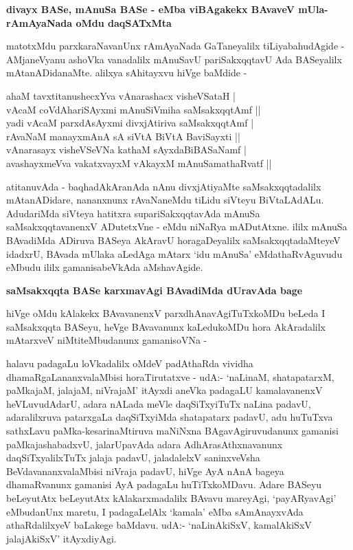 {\bigskip
\noindent
{\large\bf divayx BASe, mAnuSa BASe - eMba viBAgakekx BAvaveV mUla-rAmAyaNada oMdu daqSATxMta}}\label{page14}
\medskip

\noindent
matotxMdu parxkaraNavanUnx rAmAyaNada GaTaneyalilx tiLiyabahudAgide - AMjaneVyanu a\-shoVka vana\-dalilx mAnuSavU pariSakxqqtavU Ada BASeyalilx mAtanADidanaMte. alilxya sAhitayxvu hiVge baMdide - 

\smallskip
\begin{shloka}
ahaM tavxtitanushecxYva vAnarashacx visheVSataH |\\\label{14}
vAcaM coVdAhariSAyxmi mAnuSiVmiha saMsakxqqtAmf ||\\[4pt]

yadi vAcaM parxdAsAyxmi divxjAtiriva saMsakxqqtAmf |\\
rAvaNaM manayxmAnA sA siVtA BiVtA BaviSayxti ||\\[4pt]

vAnarasayx visheVSeVNa kathaM sAyxdaBiBASaNamf |\\
avashayxmeVva vakatxvayxM vAkayxM mAnuSamathaRvatf ||
\end{shloka}
\smallskip

\noindent
atitanuvAda - baqhadAkAranAda nAnu divxjAtiyaMte saMsakxqqtadalilx mAtanADi\-dare, nananxnunx rAvaNa\-neMdu tiLidu siVteyu BiVtaLAdALu. AdudariMda siVteya hatitxra supariSakxqqtavAda mAnuSa saMsakxqqta\-vanenxV ADutetxVne - eMdu niNaRya mADutAtxne. ililx mAnuSa BAvadiMda ADiruva BASeya AkA\-ravU horagaDeyalilx saMsakxqqtadaMteyeV idadxrU, BAvada mUlaka aLedAga mAtarx `idu mAnuSa' eMdathaRvAguvudu eMbudu ililx gamanisabeVkAda aMshavAgide.

\newpage

{\bigskip
\noindent
{\large\bf saMsakxqqta BASe karxmavAgi BAvadiMda dUravAda bage}}\label{page15}
\medskip

\noindent
hiVge oMdu kAlakekx BAvavanenxV parxdhAnavAgiTuTxkoMDu beLeda I saMsakxqqta BASeyu, heVge BAva\-vanunx kaLedukoMDu hora AkAradalilx mAtarxveV niMtiteMbudanunx gamanisoVNa - 

halavu padagaLu loVkadalilx oMdeV padAthaRda vividha dhamaRgaLananxvalaMbisi horaTirutatxve - udA:- `naLinaM, shatapatarxM, paMkajaM, jalajaM, niVrajaM' itAyxdi aneVka padagaLU kamalavanenxV heVLuvu\-dAdarU, adara nALada meVle daqSiTxyiTuTx naLina padavU, adaralilxruva patarxgaLa daqSiTxyiMda shata\-patarx pada\-vU, adu huTuTxva sathxLavu paMka-kesarinaMtiruva maNiNxna BAgavAgiruvudanunx gamanisi paMkaja\-shabadxvU, jalarUpavAda adara AdhArasAthxnavanunx daqSiTxyalilxTuTx jalaja padavU, jaladalelxV saninx\-veVsha BeVda\-vananxva\-laMbisi niVraja padavU, hiVge AyA nAnA bageya dhamaRvanunx gamanisi AyA padagaLu huTiTx\-koMDavu. Adare BASeyu beLeyutAtx beLeyutAtx kAlakarxmadalilx BAvavu mareyAgi, `payARya\-vAgi' eMbudanUnx maretu, I padagaLelAlx `kamala' eMba sAmAnayxvAda athaRdalilxyeV baLakege baMdavu. udA:- `naLinAkiSxV, kamalAkiSxV jalajAkiSxV' itAyxdiyAgi.

